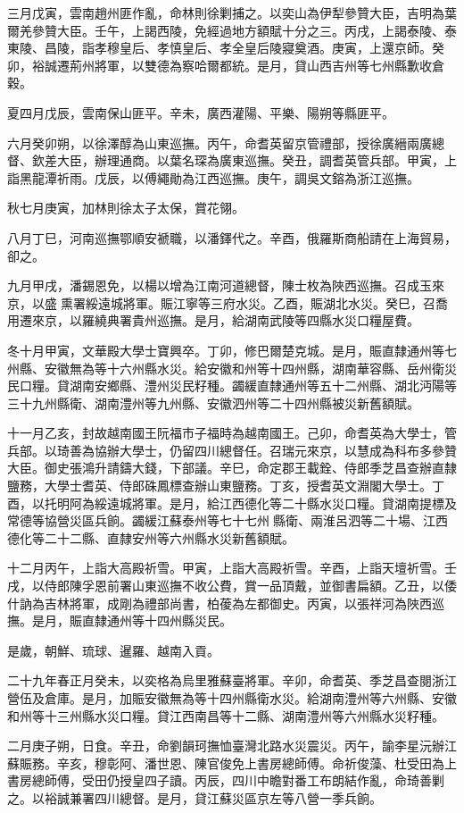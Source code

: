 \begin{pinyinscope}
三月戊寅，雲南趙州匪作亂，命林則徐剿捕之。以奕山為伊犁參贊大臣，吉明為葉爾羌參贊大臣。壬午，上謁西陵，免經過地方額賦十分之三。丙戌，上謁泰陵、泰東陵、昌陵，詣孝穆皇后、孝慎皇后、孝全皇后陵寢奠酒。庚寅，上還京師。癸卯，裕誠遷荊州將軍，以雙德為察哈爾都統。是月，貸山西吉州等七州縣歉收倉穀。

夏四月戊辰，雲南保山匪平。辛未，廣西灌陽、平樂、陽朔等縣匪平。

六月癸卯朔，以徐澤醇為山東巡撫。丙午，命耆英留京管禮部，授徐廣縉兩廣總督、欽差大臣，辦理通商。以葉名琛為廣東巡撫。癸丑，調耆英管兵部。甲寅，上詣黑龍潭祈雨。戊辰，以傅繩勛為江西巡撫。庚午，調吳文鎔為浙江巡撫。

秋七月庚寅，加林則徐太子太保，賞花翎。

八月丁巳，河南巡撫鄂順安褫職，以潘鐸代之。辛酉，俄羅斯商船請在上海貿易，卻之。

九月甲戌，潘錫恩免，以楊以增為江南河道總督，陳士枚為陜西巡撫。召成玉來京，以盛熏署綏遠城將軍。賑江寧等三府水災。乙酉，賑湖北水災。癸巳，召喬用遷來京，以羅繞典署貴州巡撫。是月，給湖南武陵等四縣水災口糧屋費。

冬十月甲寅，文華殿大學士寶興卒。丁卯，修巴爾楚克城。是月，賑直隸通州等七州縣、安徽無為等十六州縣水災。給安徽和州等十四州縣，湖南華容縣、岳州衛災民口糧。貸湖南安鄉縣、澧州災民籽種。蠲緩直隸通州等五十二州縣、湖北沔陽等三十九州縣衛、湖南澧州等九州縣、安徽泗州等二十四州縣被災新舊額賦。

十一月乙亥，封故越南國王阮福巿子福時為越南國王。己卯，命耆英為大學士，管兵部。以琦善為協辦大學士，仍留四川總督任。召瑞元來京，以慧成為科布多參贊大臣。御史張鴻升請鑄大錢，下部議。辛巳，命定郡王載銓、侍郎季芝昌查辦直隸鹽務，大學士耆英、侍郎硃鳳標查辦山東鹽務。丁亥，授耆英文淵閣大學士。丁酉，以托明阿為綏遠城將軍。是月，給江西德化等二十縣水災口糧。貸湖南提標及常德等協營災區兵餉。蠲緩江蘇泰州等七十七州縣衛、兩淮呂泗等二十場、江西德化等二十二縣、直隸安州等六州縣水災新舊額賦。

十二月丙午，上詣大高殿祈雪。甲寅，上詣大高殿祈雪。辛酉，上詣天壇祈雪。壬戌，以侍郎陳孚恩前署山東巡撫不收公費，賞一品頂戴，並御書扁額。乙丑，以倭什訥為吉林將軍，成剛為禮部尚書，柏葰為左都御史。丙寅，以張祥河為陜西巡撫。是月，賑直隸通州等十四州縣災民。

是歲，朝鮮、琉球、暹羅、越南入貢。

二十九年春正月癸未，以奕格為烏里雅蘇臺將軍。辛卯，命耆英、季芝昌查閱浙江營伍及倉庫。是月，加賑安徽無為等十四州縣衛水災。給湖南澧州等六州縣、安徽和州等十三州縣水災口糧。貸江西南昌等十二縣、湖南澧州等六州縣水災籽種。

二月庚子朔，日食。辛丑，命劉韻珂撫恤臺灣北路水災震災。丙午，諭李星沅辦江蘇賑務。辛亥，穆彰阿、潘世恩、陳官俊免上書房總師傅。命祈俊藻、杜受田為上書房總師傅，受田仍授皇四子讀。丙辰，四川中瞻對番工布朗結作亂，命琦善剿之。以裕誠兼署四川總督。是月，貸江蘇災區京左等八營一季兵餉。


\end{pinyinscope}
